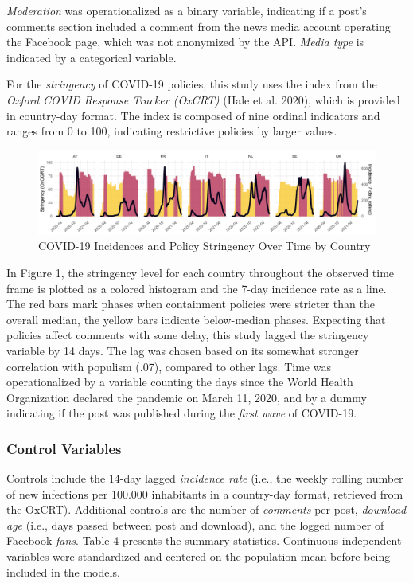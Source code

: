 \documentclass[
]{ccr}
\begin{document}
\emph{Moderation} was operationalized as a binary variable, indicating
if a post's comments section included a comment from the news media
account operating the Facebook page, which was not anonymized by the
API. \emph{Media type} is indicated by a categorical variable.

For the \emph{stringency} of COVID-19 policies, this study uses the
index from the \emph{Oxford COVID Response Tracker (OxCRT)} (Hale et al.
2020), which is provided in country-day format. The index is composed of
nine ordinal indicators and ranges from 0 to 100, indicating restrictive
policies by larger values.

\begin{figure}

{\centering \includegraphics{plots/incidenceXstrg_20240222.pdf}

}

\caption{COVID-19 Incidences and Policy Stringency Over Time by Country}

\end{figure}

In Figure 1, the stringency level for each country throughout the
observed time frame is plotted as a colored histogram and the 7-day
incidence rate as a line. The red bars mark phases when containment
policies were stricter than the overall median, the yellow bars indicate
below-median phases. Expecting that policies affect comments with some
delay, this study lagged the stringency variable by 14 days. The lag was
chosen based on its somewhat stronger correlation with populism (.07),
compared to other lags. Time was operationalized by a variable counting
the days since the World Health Organization declared the pandemic on
March 11, 2020, and by a dummy indicating if the post was published
during the \emph{first wave} of COVID-19.

\hypertarget{control-variables}{%
\subsubsection{Control Variables}\label{control-variables}}

Controls include the 14-day lagged \emph{incidence rate} (i.e., the
weekly rolling number of new infections per 100.000 inhabitants in a
country-day format, retrieved from the OxCRT). Additional controls are
the number of \emph{comments} per post, \emph{download age} (i.e., days
passed between post and download), and the logged number of Facebook
\emph{fans}. Table 4 presents the summary statistics. Continuous
independent variables were standardized and centered on the population
mean before being included in the models.
\end{document}
